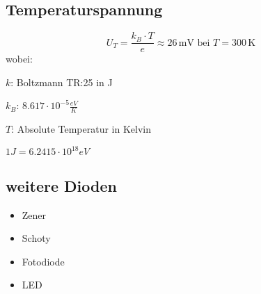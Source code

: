 \documentclass{article}
\begin{document}
\begin{minipage}[t]{0.6\textwidth}
    \subsection*{Temperaturspannung}
    \begin{equation*}
        U_T = \frac{k_B \cdot T}{e} \approx 26 \, \text{mV bei } T = 300 \, \text{K}
    \end{equation*}
    wobei:
    \begin{itemize}
        \begin{multicols}{2}
        \item $k$: Boltzmann TR:25 in J
        \item $k_B$: $8.617\cdot 10^{-5}\frac{eV}{K}$
        \item $T$: Absolute Temperatur in Kelvin
        \item $1J=6.2415\cdot 10^{18}eV$
        \end{multicols}
    \end{itemize}
\end{minipage}
\begin{minipage}[t]{0.3\textwidth}
    \subsection*{weitere Dioden}
    \begin{itemize}
        \item Zener
        \item Schoty
        \item Fotodiode
        \item LED
    \end{itemize}

\end{minipage}
\end{document}
